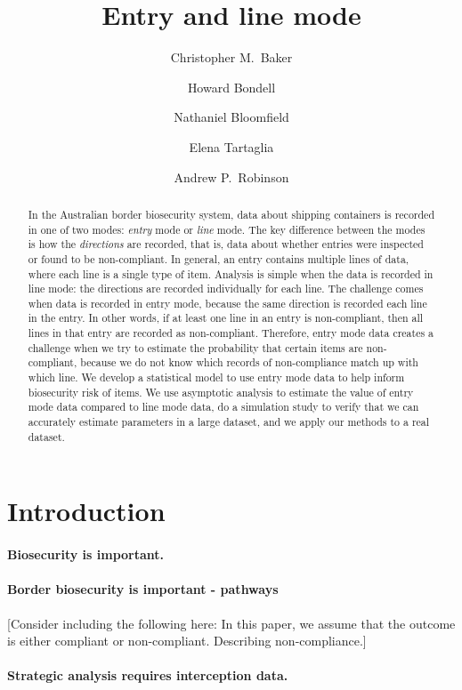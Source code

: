 \documentclass{article}
\title{Entry and line mode}
\author{Christopher M.\ Baker \and Howard Bondell \and Nathaniel Bloomfield \and Elena Tartaglia \and Andrew P.\ Robinson}
\begin{document}
  
\maketitle
\begin{abstract}
In the Australian border biosecurity system, data about shipping containers is recorded in one of two modes: \emph{entry} mode or \emph{line} mode. The key difference between the modes is how the \emph{directions} are recorded, that is, data about whether entries were inspected or found to be non-compliant. In general, an entry contains multiple lines of data, where each line is a single type of item. Analysis is simple when the data is recorded in line mode: the directions are recorded individually for each line. The challenge comes when data is recorded in entry mode, because the same direction is recorded each line in the entry. In other words, if at least one line in an entry is non-compliant, then all lines in that entry are recorded as non-compliant. Therefore, entry mode data creates a challenge when we try to estimate the probability that certain items are non-compliant, because we do not know which records of non-compliance match up with which line. We develop a statistical model to use entry mode data to help inform biosecurity risk of items. We use asymptotic analysis to estimate the value of entry mode data compared to line mode data, do a simulation study to verify that we can accurately estimate parameters in a large dataset, and we apply our methods to a real dataset. 
\end{abstract}

\section{Introduction}

\paragraph{Biosecurity is important.}

\paragraph{Border biosecurity is important - pathways}
[Consider including the following here: In this paper, we assume that the outcome is either compliant or non-compliant. 
Describing non-compliance.]

\paragraph{Strategic analysis requires interception data.}
\end{document}
